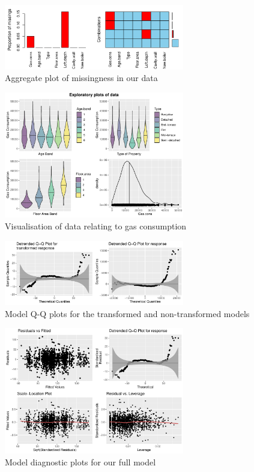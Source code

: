 \documentclass[]{extarticle}
\begin{document}
\begin{figure}[H]
	\centering
	\includegraphics[width=0.7\textwidth]{aggr_missplot}
	\caption{Aggregate plot of missingness in our data}
	\label{fig:aggrmiss}
\end{figure}

\begin{figure}[H]
	\centering
	\includegraphics[width=0.7\textwidth]{datavis}
	\caption{Visualisation of data relating to gas consumption}
	\label{fig:datavis}
\end{figure}


\begin{figure}[H]
	\centering
	\includegraphics[width=0.7\textwidth]{qqplots}
	\caption{Model Q-Q plots for the transformed and non-transformed models}
	\label{fig:qqplots}
\end{figure}

\begin{figure}[H]
	\centering
	\includegraphics[width=0.7\textwidth]{fm_diag}
	\caption{Model diagnostic plots for our full model}
	\label{fig:fmdiag}
\end{figure}
\end{document}
